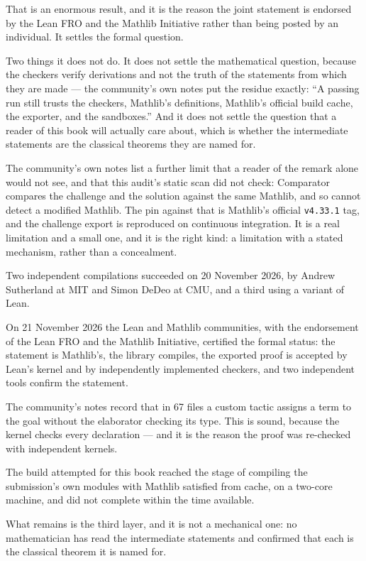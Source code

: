 That is an enormous result, and it is the reason the joint statement is
endorsed by the Lean FRO and the Mathlib Initiative rather than being posted
by an individual. It settles the formal question.

Two things it does not do. It does not settle the mathematical question,
because the checkers verify derivations and not the truth of the statements
from which they are made --- the community's own notes put the residue
exactly: ``A passing run still trusts the checkers, Mathlib's definitions,
Mathlib's official build cache, the exporter, and the sandboxes.'' And it
does not settle the question that a reader of this book will actually care
about, which is whether the intermediate statements are the classical
theorems they are named for.

The community's own notes list a further limit that a reader of the remark
alone would not see, and that this audit's static scan did not check:
Comparator compares the challenge and the solution against the same Mathlib,
and so cannot detect a modified Mathlib. The pin against that is Mathlib's
official \texttt{v4.33.1} tag, and the challenge export is reproduced on
continuous integration. It is a real limitation and a small one, and it is
the right kind: a limitation with a stated mechanism, rather than a
concealment.

\begin{keytakeaways}

\item Two independent compilations succeeded on 20 November 2026, by
Andrew Sutherland at MIT and Simon DeDeo at CMU, and a third using a variant
of Lean.

\item On 21 November 2026 the Lean and Mathlib communities, with the
endorsement of the Lean FRO and the Mathlib Initiative, certified the formal
status: the statement is Mathlib's, the library compiles, the exported proof
is accepted by Lean's kernel and by independently implemented checkers, and
two independent tools confirm the statement.

\item The community's notes record that in 67 files a custom tactic assigns a
term to the goal without the elaborator checking its type. This is sound,
because the kernel checks every declaration --- and it is the reason the
proof was re-checked with independent kernels.

\item The build attempted for this book reached the stage of compiling the
submission's own modules with Mathlib satisfied from cache, on a
two-core machine, and did not complete within the time available.

\item What remains is the third layer, and it is not a mechanical one: no
mathematician has read the intermediate statements and confirmed that each
is the classical theorem it is named for.
\end{keytakeaways}

